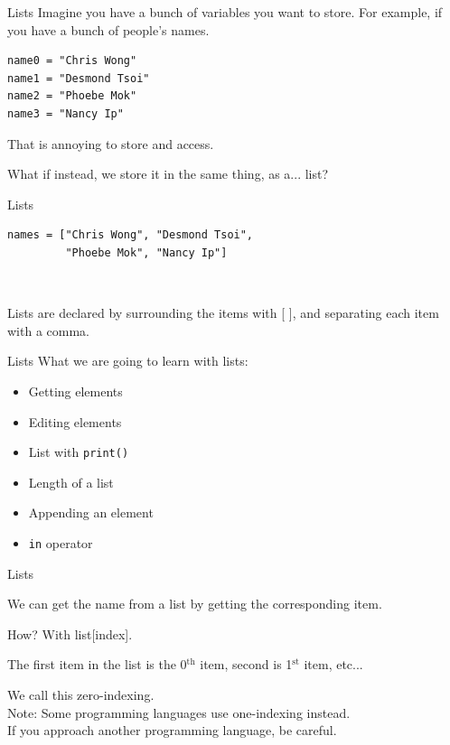 \documentclass[dvipsnames, svgnames, x11names, handout]{beamer}
\begin{document}
\begin{frame}[fragile]{Lists}
Imagine you have a bunch of variables you want to store.
For example, if you have a bunch of people's names.
\begin{verbatim}
name0 = "Chris Wong"
name1 = "Desmond Tsoi"
name2 = "Phoebe Mok"
name3 = "Nancy Ip"
\end{verbatim}
That is annoying to store and access.

\pause What if instead, we store it in the same thing, as a... \pause list?
\end{frame}

\begin{frame}[fragile]{Lists}
\begin{verbatim}
names = ["Chris Wong", "Desmond Tsoi",
         "Phoebe Mok", "Nancy Ip"]
\end{verbatim}

\

Lists are declared by surrounding the items with [ ], and separating each item with a comma.

\end{frame}

\begin{frame}[fragile]{Lists}
What we are going to learn with lists:

\begin{itemize}
    \item Getting elements
    \item Editing elements
    \item List with \texttt{print()}
    \item Length of a list
    \item Appending an element
    \item \texttt{in} operator
\end{itemize}
\end{frame}

\begin{frame}[fragile]{Lists}

We can get the name from a list by getting the corresponding item.

How? With list[index].

The first item in the list is the 0$^{\text{th}}$ item, second is 1$^{\text{st}}$ item, etc... 

We call this zero-indexing.\\

{\tiny Note: Some programming languages use one-indexing instead.\\[-1em]

\hspace{2.5em} If you approach another programming language, be careful.}
\end{frame}
\end{document}

